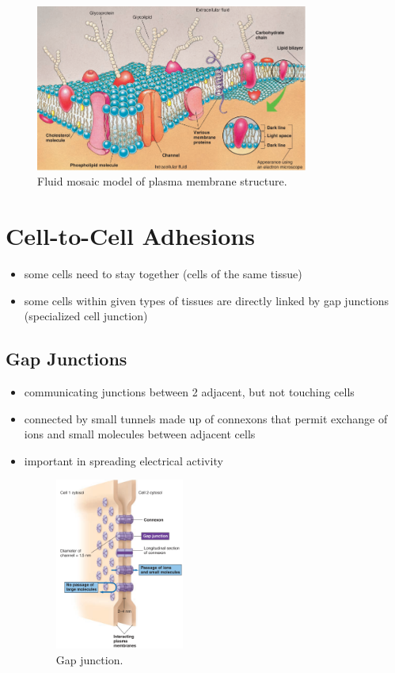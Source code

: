 \documentclass[10pt]{article}
\begin{document}
\begin{itemize}
\begin{figure}[h]
            \includegraphics[width=0.8\textwidth]{plasmaMembraneStructure}
            \caption{Fluid mosaic model of plasma membrane structure.}
            \label{fig:plasmaMembraneStructure}
        \end{figure}
\end{itemize}


\section{Cell-to-Cell Adhesions}
\begin{itemize}
    \item some cells need to stay together (cells of the same tissue)
    \item some cells within given types of tissues are directly linked by gap junctions (specialized cell junction)
\end{itemize}
\subsection{Gap Junctions}
\begin{itemize}
    \item communicating junctions between 2 adjacent, but not touching cells 
    \item connected by small tunnels made up of connexons that permit exchange of ions and small molecules between adjacent cells 
    \item important in spreading electrical activity
        \begin{figure}[h]
            \centering
            \includegraphics[width=0.4\textwidth]{gapJunction}
            \caption{Gap junction.}
            \label{fig:gapJunction}
        \end{figure}
\end{itemize}
\end{document}
